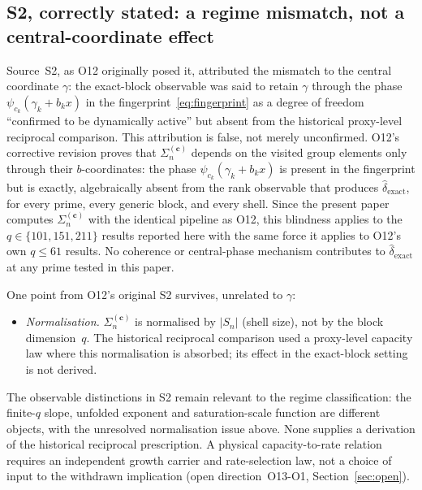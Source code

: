 \documentclass[11pt,a4paper]{article}
\theoremstyle{plain}
\theoremstyle{definition}
\newcommand{\dhat}{\hat\delta_{\mathrm{exact}}}
\begin{document}
  \subsection{S2, correctly stated: a regime mismatch, not a central-coordinate effect}

    Source~S2, as O12 originally posed it, attributed the mismatch to the central
    coordinate $\gamma$: the exact-block observable was said to retain $\gamma$
    through the phase $\psi_{c_k}(\gamma_k + b_k x)$ in the
    fingerprint~\eqref{eq:fingerprint} as a degree of freedom ``confirmed to be
    dynamically active'' but absent from the historical proxy-level reciprocal comparison.
    This attribution is false, not merely unconfirmed.
    O12's corrective revision proves that $\Sigma_n^{(\mathbf{c})}$ depends on the
    visited group elements only through their $b$-coordinates: the phase
    $\psi_{c_k}(\gamma_k+b_kx)$ is present in the fingerprint but is exactly,
    algebraically absent from the rank observable that produces $\dhat$, for
    every prime, every generic block, and every shell.
    Since the present paper computes $\Sigma_n^{(\mathbf{c})}$ with the identical
    pipeline as O12, this blindness applies to the $q\in\{101,151,211\}$ results
    reported here with the same force it applies to O12's own $q\leq61$ results.
    No coherence or central-phase mechanism contributes to $\dhat$ at any prime
    tested in this paper.

    One point from O12's original S2 survives, unrelated to $\gamma$:

    \begin{itemize}
      \item \emph{Normalisation.}
      $\Sigma_n^{(\mathbf{c})}$ is normalised by $|S_n|$ (shell size), not by
      the block dimension~$q$.
      The historical reciprocal comparison used a proxy-level capacity law where this
      normalisation is absorbed; its effect in the exact-block setting is not
      derived.
    \end{itemize}

    The observable distinctions in S2 remain relevant to the regime classification:
    the finite-$q$ slope, unfolded exponent and saturation-scale function are different objects,
    with the unresolved normalisation issue above.
    None supplies a derivation of the historical reciprocal prescription.
    A physical capacity-to-rate relation requires an independent growth carrier and
    rate-selection law, not a choice of input to the withdrawn implication
    (open direction~O13-O1, Section~\ref{sec:open}).
\end{document}
